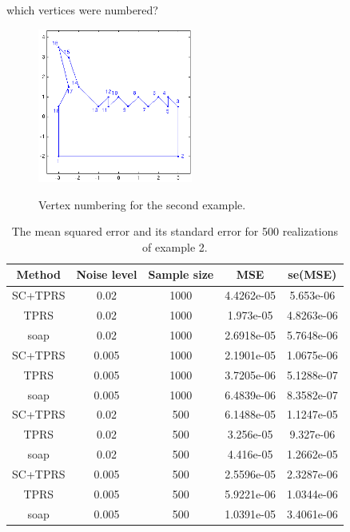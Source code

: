 \documentclass[a4paper,10pt]{amsart}
\begin{document}
which vertices were numbered?

\begin{figure}
\centering
\includegraphics[width=2in]{figs-otherdomains/wigglytop-numbered.png} \\
\caption{Vertex numbering for the second example.}
\label{wigglytop-numbered}
\end{figure}






\begin{table}[ht]
\begin{tabular}{c c c c c}\\
Method & Noise level & Sample size & MSE & se(MSE)\\
\hline
\hline
SC+TPRS & 0.02 & 1000 & 4.4262e-05 & 5.653e-06\\
TPRS & 0.02 & 1000 & 1.973e-05 & 4.8263e-06\\
soap & 0.02 & 1000 & 2.6918e-05 & 5.7648e-06\\
SC+TPRS & 0.005 & 1000 & 2.1901e-05 & 1.0675e-06\\
TPRS & 0.005 & 1000 & 3.7205e-06 & 5.1288e-07\\
soap & 0.005 & 1000 & 6.4839e-06 & 8.3582e-07\\
SC+TPRS & 0.02 & 500 & 6.1488e-05 & 1.1247e-05\\
TPRS & 0.02 & 500 & 3.256e-05 & 9.327e-06\\
soap & 0.02 & 500 & 4.416e-05 & 1.2662e-05\\
SC+TPRS & 0.005 & 500 & 2.5596e-05 & 2.3287e-06\\
TPRS & 0.005 & 500 & 5.9221e-06 & 1.0344e-06\\
soap & 0.005 & 500 & 1.0391e-05 & 3.4061e-06\\
\end{tabular}
\caption{The mean squared error and its standard error for 500 realizations of example 2.}
\label{wigglytop-table}
\end{table}
\end{document}
